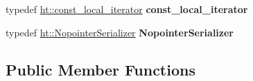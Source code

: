 \begin{DoxyCompactItemize}
\item 
typedef \hyperlink{classspp___1_1_two__d__iterator}{ht\+::const\+\_\+local\+\_\+iterator} {\bfseries const\+\_\+local\+\_\+iterator}\hypertarget{classspp___1_1sparse__hash__map_a8ff12017311114bfcdb5096bc63ce336}{}\label{classspp___1_1sparse__hash__map_a8ff12017311114bfcdb5096bc63ce336}

\item 
typedef \hyperlink{structspp___1_1sparsehash__internal_1_1pod__serializer}{ht\+::\+Nopointer\+Serializer} {\bfseries Nopointer\+Serializer}\hypertarget{classspp___1_1sparse__hash__map_a75eaab6abc1b6b002b6961943f7af347}{}\label{classspp___1_1sparse__hash__map_a75eaab6abc1b6b002b6961943f7af347}

\end{DoxyCompactItemize}
\subsection*{Public Member Functions}
